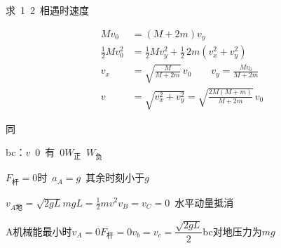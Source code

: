 \begin{problem}[2.]

求\ 1\ 2\ 相遇时速度
\begin{solution}
\begin{align*}
Mv_0&=(M+2m)v_y\\
\frac{1}{2}Mv_0^2&=\frac{1}{2}Mv_y^2+\frac{1}{2}\,2m\left(v_x^2+v_y^2\right)\\
v_x&=\sqrt{\frac{M}{M+2m}}\,v_0\qquad v_y=\frac{Mv_0}{M+2m}\\
v&=\sqrt{v_x^2+v_y^2}=\sqrt{\frac{2M(M+m)}{M+2m}}\,v_0 %
\end{align*}
\end{solution}
\end{problem}

同


bc：$v$\ 0\ 有\ 0\quad $W_{\text{正}}$\ $W_{\text{负}}$

$F_{\text{杆}}=0$时\ $a_A=g$\ 其余时刻小于$g$

$v_{A\text{地}}=\sqrt{2gL}$\quad $mgL=\frac{1}{2}mv^2$\quad $v_B=v_C=0$\ 水平动量抵消

A机械能最小时\quad $v_A=0$\quad $F_{\text{杆}}=0$\quad $v_b=v_c=\dfrac{\sqrt{2gL}}{2}$\quad bc对地压力为$mg$


